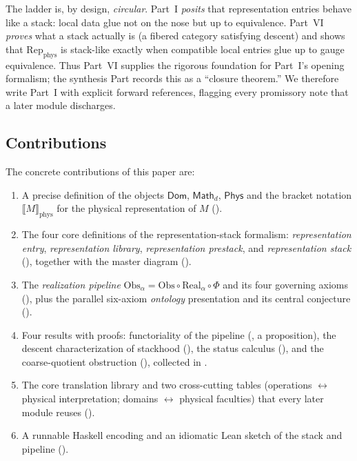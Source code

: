 \documentclass[12pt]{article}
\theoremstyle{definition}
\theoremstyle{remark}
\newcommand{\Dom}{\mathsf{Dom}}
\newcommand{\Math}{\mathsf{Math}}
\newcommand{\Phys}{\mathsf{Phys}}
\newcommand{\Real}{\mathrm{Real}}
\newcommand{\Obs}{\mathrm{Obs}}
\newcommand{\Repphys}{\mathrm{Rep}_{\mathrm{phys}}}
\newcommand{\physrep}[1]{\llbracket #1 \rrbracket_{\mathrm{phys}}}
\begin{document}
The ladder is, by design, \emph{circular}.
Part~I \emph{posits} that representation entries behave like a stack: local
data glue not on the nose but up to equivalence. Part~VI \emph{proves} what a
stack actually is (a fibered category satisfying descent) and shows that
$\Repphys$ is stack-like exactly when compatible local entries glue up to gauge
equivalence. Thus Part~VI supplies the rigorous foundation for Part~I's opening
formalism; the synthesis Part records this as a ``closure theorem.'' We
therefore write Part~I with explicit forward references, flagging every
promissory note that a later module discharges.

\subsection{Contributions}

The concrete contributions of this paper are:

\begin{enumerate}[leftmargin=2.2em]
\item A precise definition of the objects $\Dom$, $\Math_d$, $\Phys$ and the
  bracket notation $\physrep{M}$ for the physical representation of $M$
  ().
\item The four core definitions of the representation-stack formalism:
  \emph{representation entry}, \emph{representation library},
  \emph{representation prestack}, and \emph{representation stack}
  (), together with the master diagram
  ().
\item The \emph{realization pipeline} $\Obs_\alpha = \Obs\circ\Real_\alpha\circ\Phi$
  and its four governing axioms (), plus the parallel
  six-axiom \emph{ontology} presentation and its central conjecture
  ().
\item Four results with proofs: functoriality of the pipeline
  (, a proposition), the descent characterization of
  stackhood (), the status calculus (), and
  the coarse-quotient obstruction (), collected in
  .
\item The core translation library and two cross-cutting tables
  (operations $\leftrightarrow$ physical interpretation; domains $\leftrightarrow$
  physical faculties) that every later module reuses ().
\item A runnable Haskell encoding and an idiomatic Lean sketch of the stack and
  pipeline ().
\end{enumerate}
\end{document}
